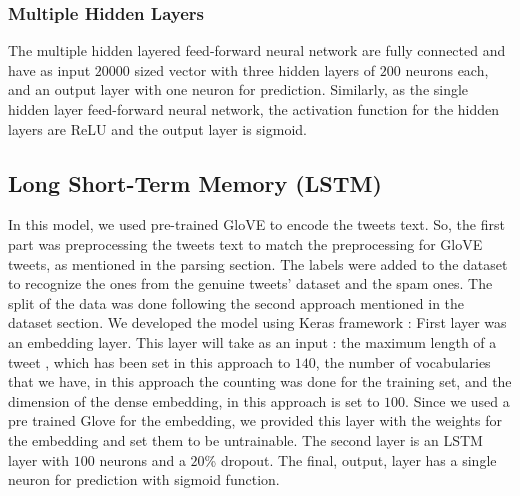 \subsubsection{Multiple Hidden Layers} The multiple hidden layered
feed-forward neural network are fully connected and have as input
$20000$ sized vector with three hidden layers of $200$ neurons each, and
an output layer with one neuron for prediction. Similarly, as the
single hidden layer feed-forward neural network, the activation
function for the hidden layers are ReLU and the output layer is sigmoid.

\subsection{Long Short-Term Memory (LSTM)}
In this model, we used pre-trained GloVE to encode the tweets text. So, the first part was preprocessing the tweets text to match the preprocessing for GloVE tweets, as mentioned in the parsing section. The labels were added to the dataset to recognize the ones from the genuine tweets’ dataset and the spam ones. The split of the data was done following the second approach mentioned in the dataset section. We developed the model using Keras framework  \citep{chollet2015keras}:
First layer was an embedding layer. This layer will take as an input : the maximum length of a tweet , which has been set in this approach to $140$, the number of vocabularies that we have, in this approach the counting was done for the training set, and the dimension of the dense embedding, in this approach is set to $100$. Since we used a pre trained Glove for the embedding, we provided this layer with the weights for the embedding and set them to be untrainable. 
The second layer is an LSTM layer with $100$ neurons and a $20$\% dropout. 
The final, output, layer has a single neuron for prediction with sigmoid function.


